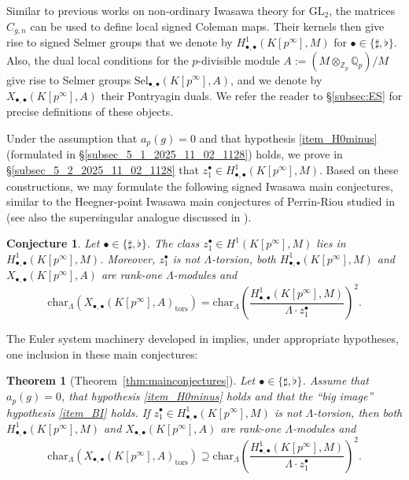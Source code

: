\documentclass{amsart}
\numberwithin{equation}{section}
\newtheorem*{conjecture*}{Conjecture}
\newtheorem{lthm}{Theorem}
\newcommand{\bb}{\mathbb}
\newcommand{\GL}{\mathrm{GL}}
\newcommand{\Sel}{\mathrm{Sel}}
\newcommand{\Char}{\mathrm{char}}
\begin{document}
Similar to previous works on non-ordinary Iwasawa theory for $\GL_2$, the matrices $C_{g,n}$ can be used to define local signed Coleman maps. Their kernels then give rise to signed Selmer groups that we denote by $H^1_{\bullet,\bullet}(K[p^\infty],M)$ for $\bullet\in \lbrace \sharp,\flat\rbrace$. Also, the dual local conditions for the $p$-divisible module $A:=(M\otimes_{\bb{Z}_p}\bb{Q}_p)/M$ give rise to Selmer groups $\Sel_{\bullet,\bullet}(K[p^\infty],A)$, and we denote by $X_{\bullet,\bullet}(K[p^\infty],A)$ their Pontryagin duals. We refer the reader to \S\ref{subsec:ES} for precise definitions of these objects.

Under the assumption that $a_p(g)=0$ and that hypothesis \eqref{item_H0minus} (formulated in \S\ref{subsec_5_1_2025_11_02_1128}) holds, we prove in \S\ref{subsec_5_2_2025_11_02_1128} that $z_1^\bullet\in H^1_{\bullet,\bullet}(K[p^\infty],M)$. Based on these constructions, we may formulate the following signed Iwasawa main conjectures, similar to the Heegner-point Iwasawa main conjectures of Perrin-Riou studied in \cite{PR-Heegner-IMC} (see also the supersingular analogue discussed in \cite{castellawan}).




\begin{conjecture*}
    Let $\bullet\in \lbrace \sharp,\flat\rbrace$. The class $z_1^\bullet\in H^1(K[p^\infty],M)$ lies in $H^1_{\bullet,\bullet}(K[p^\infty],M)$. Moreover, $z_1^\bullet$ is not $\Lambda$-torsion, both $H^1_{\bullet,\bullet}(K[p^\infty],M)$ and $X_{\bullet,\bullet}(K[p^\infty],A)$ are rank-one $\Lambda$-modules and
    \[
    \Char_{\Lambda}\left(X_{\bullet,\bullet}(K[p^\infty],A)_{\mathrm{tors}}\right)=\Char_\Lambda\left(\frac{H^1_{\bullet,\bullet}(K[p^\infty],M)}{\Lambda \cdot z_1^\bullet}\right)^2.
    \]
\end{conjecture*}

The Euler system machinery developed in \cite{JNS} implies, under appropriate hypotheses, one inclusion in these main conjectures:

\begin{lthm}[Theorem~\ref{thm:mainconjectures}]\label{thmD}
Let $\bullet\in\lbrace \sharp,\flat\rbrace$. Assume that $a_p(g)=0$, that hypothesis \eqref{item_H0minus} holds and that the ``big image'' hypothesis \eqref{item_BI} holds. If $z_1^\bullet\in H^1_{\bullet,\bullet}(K[p^\infty],M)$ is not $\Lambda$-torsion, then both $H^1_{\bullet,\bullet}(K[p^\infty],M)$ and $X_{\bullet,\bullet}(K[p^\infty],A)$ are rank-one $\Lambda$-modules and
\[
\Char_{\Lambda}\left(X_{\bullet,\bullet}(K[p^\infty],A)_{\mathrm{tors}}\right)\supseteq\Char_{\Lambda} \left(\frac{H^1_{\bullet,\bullet}(K[p^\infty],M)}{\Lambda \cdot z_1^\bullet} \right)^2.
\]
\end{lthm}
\end{document}
